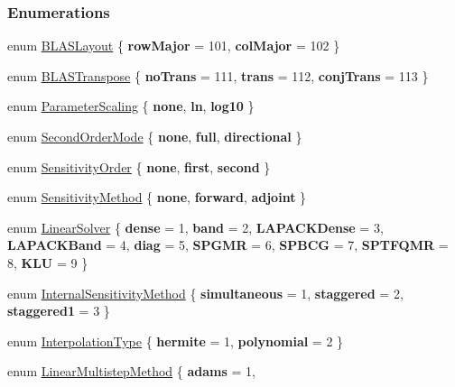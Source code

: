 \subsubsection*{Enumerations}
\begin{DoxyCompactItemize}
\item 
enum \mbox{\hyperlink{namespaceamici_a3ec6460bb4e7f6100a15d18627a3ff3e}{B\+L\+A\+S\+Layout}} \{ {\bfseries row\+Major} = 101, 
{\bfseries col\+Major} = 102
 \}
\item 
enum \mbox{\hyperlink{namespaceamici_a0f0ec77c6c8f48d9c5cb50d54899afae}{B\+L\+A\+S\+Transpose}} \{ {\bfseries no\+Trans} = 111, 
{\bfseries trans} = 112, 
{\bfseries conj\+Trans} = 113
 \}
\item 
enum \mbox{\hyperlink{namespaceamici_a42f062082226e9284c201d9eab71a3a0}{Parameter\+Scaling}} \{ {\bfseries none}, 
{\bfseries ln}, 
{\bfseries log10}
 \}
\item 
enum \mbox{\hyperlink{namespaceamici_a2d77779286167d5603a870bf9f6c21ba}{Second\+Order\+Mode}} \{ {\bfseries none}, 
{\bfseries full}, 
{\bfseries directional}
 \}
\item 
enum \mbox{\hyperlink{namespaceamici_aaa03ec2f8c4d5323b98d71134a462fda}{Sensitivity\+Order}} \{ {\bfseries none}, 
{\bfseries first}, 
{\bfseries second}
 \}
\item 
enum \mbox{\hyperlink{namespaceamici_aa0fa493529f6872e7e776b91fbbf38f9}{Sensitivity\+Method}} \{ {\bfseries none}, 
{\bfseries forward}, 
{\bfseries adjoint}
 \}
\item 
enum \mbox{\hyperlink{namespaceamici_a1a6a4776314a0843143e5631c3ce21a7}{Linear\+Solver}} \{ \newline
{\bfseries dense} = 1, 
{\bfseries band} = 2, 
{\bfseries L\+A\+P\+A\+C\+K\+Dense} = 3, 
{\bfseries L\+A\+P\+A\+C\+K\+Band} = 4, 
\newline
{\bfseries diag} = 5, 
{\bfseries S\+P\+G\+MR} = 6, 
{\bfseries S\+P\+B\+CG} = 7, 
{\bfseries S\+P\+T\+F\+Q\+MR} = 8, 
\newline
{\bfseries K\+LU} = 9
 \}
\item 
enum \mbox{\hyperlink{namespaceamici_aa444c52f0a5638d68702d1ec92f8db87}{Internal\+Sensitivity\+Method}} \{ {\bfseries simultaneous} = 1, 
{\bfseries staggered} = 2, 
{\bfseries staggered1} = 3
 \}
\item 
enum \mbox{\hyperlink{namespaceamici_a8472f01c511d77bbfb981a46618ea1ea}{Interpolation\+Type}} \{ {\bfseries hermite} = 1, 
{\bfseries polynomial} = 2
 \}
\item 
enum \mbox{\hyperlink{namespaceamici_a9ebe272482a8e073efe7078b7e96e8bc}{Linear\+Multistep\+Method}} \{ {\bfseries adams} = 1, 

\end{DoxyCompactItemize}
